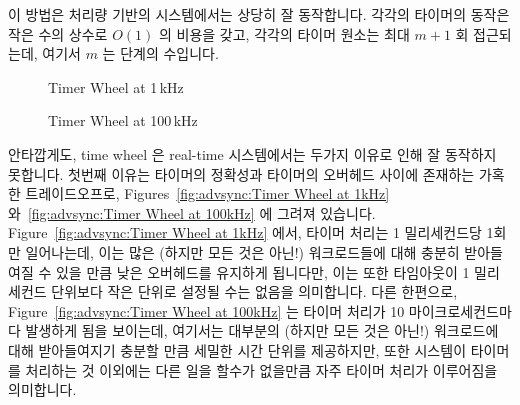 이 방법은 처리량 기반의 시스템에서는 상당히 잘 동작합니다.
각각의 타이머의 동작은 작은 수의 상수로 $O(1)$ 의 비용을 갖고, 각각의 타이머
원소는 최대 $m+1$ 회 접근되는데, 여기서 $m$ 는 단계의 수입니다.

\begin{figure}[tb]
\centering
{}
\caption{Timer Wheel at 1\,kHz}
\end{figure}

\begin{figure}[tb]
\centering
{}
\caption{Timer Wheel at 100\,kHz}
\end{figure}

안타깝게도, time wheel 은 real-time 시스템에서는 두가지 이유로 인해 잘 동작하지
못합니다.
첫번째 이유는 타이머의 정확성과 타이머의 오버헤드 사이에 존재하는 가혹한
트레이드오프로,
Figures~\ref{fig:advsync:Timer Wheel at 1kHz}
와~\ref{fig:advsync:Timer Wheel at 100kHz}
에 그려져 있습니다.
Figure~\ref{fig:advsync:Timer Wheel at 1kHz} 에서, 타이머 처리는 1 밀리세컨드당
1회만 일어나는데, 이는 많은 (하지만 모든 것은 아닌!) 워크로드들에 대해 충분히
받아들여질 수 있을 만큼 낮은 오버헤드를 유지하게 됩니다만, 이는 또한 타임아웃이
1 밀리세컨드 단위보다 작은 단위로 설정될 수는 없음을 의미합니다.
다른 한편으로,
Figure~\ref{fig:advsync:Timer Wheel at 100kHz}
는 타이머 처리가 10 마이크로세컨드마다 발생하게 됨을 보이는데, 여기서는
대부분의 (하지만 모든 것은 아닌!) 워크로드에 대해 받아들여지기 충분할 만큼
세밀한 시간 단위를 제공하지만, 또한 시스템이 타이머를 처리하는 것 이외에는 다른
일을 할수가 없을만큼 자주 타이머 처리가 이루어짐을 의미합니다.
\iffalse

